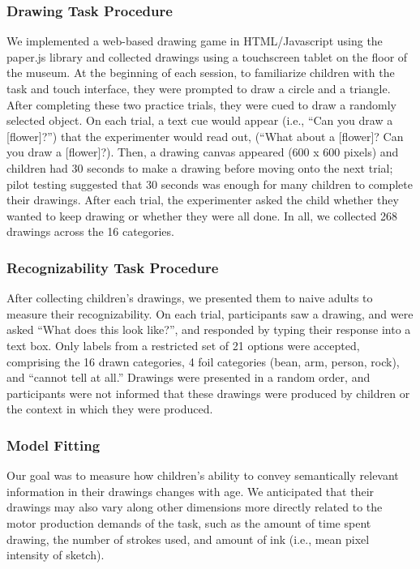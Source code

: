 \documentclass[10pt, letterpaper]{article}
\begin{document}
\subsubsection{Drawing Task Procedure}\label{drawing-task-procedure}

We implemented a web-based drawing game in HTML/Javascript using the
paper.js library and collected drawings using a touchscreen tablet on
the floor of the museum. At the beginning of each session, to
familiarize children with the task and touch interface, they were
prompted to draw a circle and a triangle. After completing these two
practice trials, they were cued to draw a randomly selected object. On
each trial, a text cue would appear (i.e., ``Can you draw a
{[}flower{]}?'') that the experimenter would read out, (``What about a
{[}flower{]}? Can you draw a {[}flower{]}?). Then, a drawing canvas
appeared (600 x 600 pixels) and children had 30 seconds to make a
drawing before moving onto the next trial; pilot testing suggested that
30 seconds was enough for many children to complete their drawings.
After each trial, the experimenter asked the child whether they wanted
to keep drawing or whether they were all done. In all, we collected 268
drawings across the 16 categories.

\subsubsection{Recognizability Task
Procedure}\label{recognizability-task-procedure}

After collecting children's drawings, we presented them to naive adults
to measure their recognizability. On each trial, participants saw a
drawing, and were asked ``What does this look like?'', and responded by
typing their response into a text box. Only labels from a restricted set
of 21 options were accepted, comprising the 16 drawn categories, 4 foil
categories (bean, arm, person, rock), and ``cannot tell at all.''
Drawings were presented in a random order, and participants were not
informed that these drawings were produced by children or the context in
which they were produced.

\subsubsection{Model Fitting}\label{model-fitting}

Our goal was to measure how children's ability to convey semantically
relevant information in their drawings changes with age. We anticipated
that their drawings may also vary along other dimensions more directly
related to the motor production demands of the task, such as the amount
of time spent drawing, the number of strokes used, and amount of ink
(i.e., mean pixel intensity of sketch).
\end{document}
